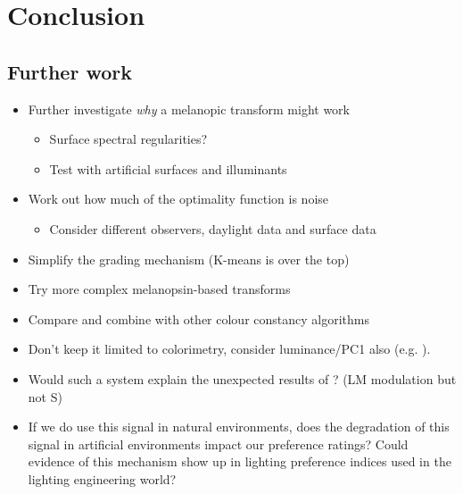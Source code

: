 

\section{Conclusion}

\subsection{Further work}

\begin{itemize}
\item Further investigate \emph{why} a melanopic transform might work
\begin{itemize}
\item Surface spectral regularities?
\item Test with artificial surfaces and illuminants
\end{itemize}
\item Work out how much of the optimality function is noise
\begin{itemize}
\item Consider different observers, daylight data and surface data
\end{itemize}
\item Simplify the grading mechanism (K-means is over the top)
\item Try more complex melanopsin-based transforms
\item Compare and combine with other colour constancy algorithms
\item Don't keep it limited to colorimetry, consider luminance/PC1 also (e.g. \citet{chakrabarti_color_2015}). 
\item Would such a system explain the unexpected results of \citet{cao_evidence_2018}? (LM modulation but not S)
\item If we do use this signal in natural environments, does the degradation of this signal in artificial environments impact our preference ratings? Could evidence of this mechanism show up in lighting preference indices used in the lighting engineering world?
\end{itemize}


